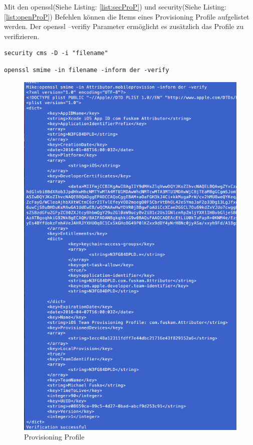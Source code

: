 Mit den \glqq openssl\grqq{}(Siehe Listing: \ref{list:secProP}) und \glqq security\grqq{}(Siehe Listing: \ref{list:openProP}) Befehlen können die Items eines Provisioning Profile aufgelistet werden. Der \glqq openssl --verifiy\grqq{} Parameter ermöglicht es zusätzlich das Profile zu verifizieren. 
\newline

\lstset{
    language=bash,
    }
\begin{lstlisting}[captionpos=b, caption={Befehl: security}, label=list:secProP]
security cms -D -i "filename" 
\end{lstlisting}

\begin{lstlisting}[captionpos=b, caption={Befehl: openssl -- (Siehe Abbildung: \ref{fig:ProvisioningProfile})}, label=list:openProP]
openssl smime -in filename -inform der -verify
\end{lstlisting}

\begin{figure}[!ht]
        \centering
                \includegraphics[scale=0.6]{SGML-Format}
        \caption{Provisioning Profile}
        \label{fig:ProvisioningProfile}
\end{figure}


